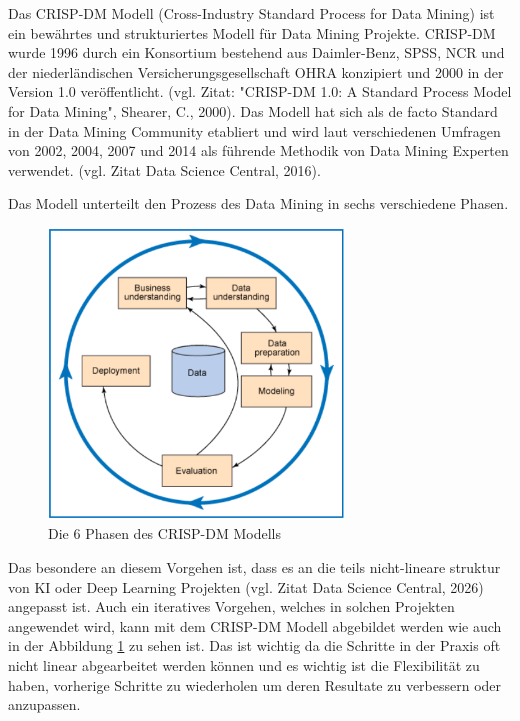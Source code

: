 Das CRISP-DM Modell (Cross-Industry Standard Process for Data Mining) ist ein bewährtes und strukturiertes Modell für Data Mining Projekte. 
CRISP-DM wurde 1996 durch ein Konsortium bestehend aus Daimler-Benz, SPSS, NCR und der niederländischen Versicherungsgesellschaft OHRA konzipiert und 2000 in der Version 1.0 veröffentlicht. (vgl. Zitat: "CRISP-DM 1.0: A Standard Process Model for Data Mining", Shearer, C., 2000).
Das Modell hat sich als de facto Standard in der Data Mining Community etabliert und wird laut verschiedenen Umfragen von 2002, 2004, 2007 und 2014 als führende Methodik von Data Mining Experten verwendet. (vgl. Zitat Data Science Central, 2016).

Das Modell unterteilt den Prozess des Data Mining in sechs verschiedene Phasen.

\begin{figure}[ht]
    \centering
    \includegraphics[width=0.7\textwidth]{figures/crispdm.png}
    \caption{Die 6 Phasen des CRISP-DM Modells}
    \label{fig:crispdm}
\end{figure}

Das besondere an diesem Vorgehen ist, dass es an die teils nicht-lineare struktur von KI oder Deep Learning Projekten (vgl. Zitat Data Science Central, 2026) angepasst ist. Auch ein iteratives Vorgehen, welches in solchen Projekten angewendet wird, kann mit dem CRISP-DM Modell abgebildet werden wie auch in der Abbildung \ref{fig:crispdm} zu sehen ist. Das ist wichtig da die Schritte in der Praxis oft nicht linear abgearbeitet werden können und es wichtig ist die Flexibilität zu haben, vorherige Schritte zu wiederholen um deren Resultate zu verbessern oder anzupassen.

